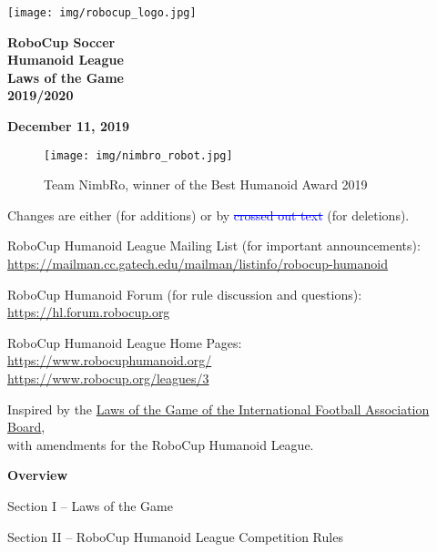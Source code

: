 \documentclass[a4paper]{article}
\title{}
\author{\rulesauthor}
\date{2019-12-11}
\newcommand{\removed}[1]{\textcolor{blue}{\sout{#1}}}
\newcommand{\added}[1]{{\color{magenta}{#1}}}
\begin{document}
\sffamily

\begin{center}
\texttt{[image: img/robocup\_logo.jpg]}

{\Huge \bfseries
RoboCup Soccer
\\
Humanoid League
\\
Laws of the Game
\\ \vspace{0.5cm}
2019/2020}

\bigskip

{\bfseries December 11, 2019}
\end{center}

\begin{figure}[!h]
\centering
\texttt{[image: img/nimbro\_robot.jpg]}
\captionsetup{labelformat=empty}
\caption{Team NimbRo, winner of the Best Humanoid Award 2019}
\end{figure}

{\large Changes are either \added{marked in magenta text colour} (for additions) or by  \removed{crossed out text} (for deletions).}

\bigskip
RoboCup Humanoid League Mailing List (for important announcements):\\
\url{https://mailman.cc.gatech.edu/mailman/listinfo/robocup-humanoid}

\medskip
RoboCup Humanoid Forum (for rule discussion and questions):\\
\url{https://hl.forum.robocup.org}

\medskip
RoboCup Humanoid League Home Pages:\\
\url{https://www.robocuphumanoid.org/}\\
\url{https://www.robocup.org/leagues/3}

\medskip
Inspired by the \href{https://resources.fifa.com/image/upload/laws-of-the-game-2018-19.pdf?cloudid=khhloe2xoigyna8juxw3}{\textcolor[rgb]{0,0,0.5}{Laws of the Game of the International Football Association Board}},\\
with amendments for the RoboCup Humanoid League.

\setcounter{figure}{0}

\clearpage

{\bfseries\color[rgb]{0.4,0.4,0.4}
Overview}

\bigskip

Section I -- Laws of the Game

\bigskip

Section II -- RoboCup Humanoid League Competition Rules
\end{document}
